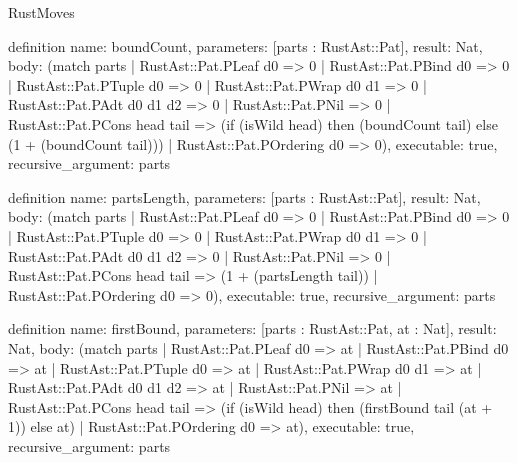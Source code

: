 \begin{lexlean}{RustMoves}
\begin{semanticmodule}
definition{
  name: boundCount,
  parameters: [parts : RustAst::Pat],
  result: Nat,
  body: (match parts
    | RustAst::Pat.PLeaf d0 => 0
    | RustAst::Pat.PBind d0 => 0
    | RustAst::Pat.PTuple d0 => 0
    | RustAst::Pat.PWrap d0 d1 => 0
    | RustAst::Pat.PAdt d0 d1 d2 => 0
    | RustAst::Pat.PNil => 0
    | RustAst::Pat.PCons head tail => (if (isWild head) then (boundCount tail) else (1 + (boundCount tail)))
    | RustAst::Pat.POrdering d0 => 0),
  executable: true,
  recursive_argument: parts
}

definition{
  name: partsLength,
  parameters: [parts : RustAst::Pat],
  result: Nat,
  body: (match parts
    | RustAst::Pat.PLeaf d0 => 0
    | RustAst::Pat.PBind d0 => 0
    | RustAst::Pat.PTuple d0 => 0
    | RustAst::Pat.PWrap d0 d1 => 0
    | RustAst::Pat.PAdt d0 d1 d2 => 0
    | RustAst::Pat.PNil => 0
    | RustAst::Pat.PCons head tail => (1 + (partsLength tail))
    | RustAst::Pat.POrdering d0 => 0),
  executable: true,
  recursive_argument: parts
}

definition{
  name: firstBound,
  parameters: [parts : RustAst::Pat, at : Nat],
  result: Nat,
  body: (match parts
    | RustAst::Pat.PLeaf d0 => at
    | RustAst::Pat.PBind d0 => at
    | RustAst::Pat.PTuple d0 => at
    | RustAst::Pat.PWrap d0 d1 => at
    | RustAst::Pat.PAdt d0 d1 d2 => at
    | RustAst::Pat.PNil => at
    | RustAst::Pat.PCons head tail => (if (isWild head) then (firstBound tail (at + 1)) else at)
    | RustAst::Pat.POrdering d0 => at),
  executable: true,
  recursive_argument: parts
}


\end{semanticmodule}
\end{lexlean}
